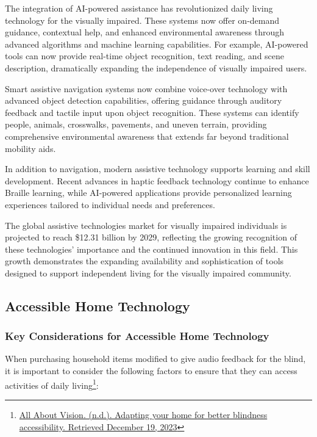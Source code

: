 The integration of AI-powered assistance has revolutionized daily living technology for the visually impaired. These systems now offer on-demand guidance, contextual help, and enhanced environmental awareness through advanced algorithms and machine learning capabilities. For example, AI-powered tools can now provide real-time object recognition, text reading, and scene description, dramatically expanding the independence of visually impaired users.

Smart assistive navigation systems now combine voice-over technology with advanced object detection capabilities, offering guidance through auditory feedback and tactile input upon object recognition. These systems can identify people, animals, crosswalks, pavements, and uneven terrain, providing comprehensive environmental awareness that extends far beyond traditional mobility aids.

In addition to navigation, modern assistive technology supports learning and skill development. Recent advances in haptic feedback technology continue to enhance Braille learning, while AI-powered applications provide personalized learning experiences tailored to individual needs and preferences.

The global assistive technologies market for visually impaired individuals is projected to reach \$12.31 billion by 2029, reflecting the growing recognition of these technologies' importance and the continued innovation in this field. This growth demonstrates the expanding availability and sophistication of tools designed to support independent living for the visually impaired community.

\subsection{Accessible Home Technology}\label{ind-living-tools}
\subsubsection{Key Considerations for Accessible Home Technology}

When purchasing household items modified to give audio feedback for the blind, it is important to consider the following factors to ensure that they can access activities of daily living\footnote{\href{http://www.allaboutvision.com/resources/adapting-the-home-better-blindness-accessibility/}{All About Vision. (n.d.). Adapting your home for better blindness accessibility. Retrieved December 19, 2023}}:

